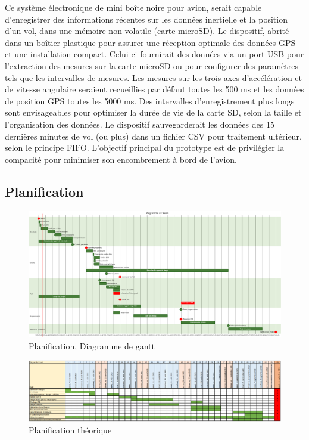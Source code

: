 Ce système électronique de mini boîte noire pour avion, serait capable d'enregistrer des informations récentes sur les données inertielle et la position d'un vol, dans une mémoire non volatile (carte microSD). Le dispositif, abrité dans un boîtier plastique pour assurer une réception optimale des données GPS et une installation compact. Celui-ci fournirait des données via un port USB pour l'extraction des mesures sur la carte microSD ou pour configurer des paramètres tels que les intervalles de mesures. Les mesures sur les trois axes d'accélération et de vitesse angulaire seraient recueillies par défaut toutes les 500 ms et les données de position GPS toutes les 5000 ms. Des intervalles d'enregistrement plus longs sont envisageables pour optimiser la durée de vie de la carte SD, selon la taille et l'organisation des données. Le dispositif sauvegarderait les données des 15 dernières minutes de vol (ou plus) dans un fichier CSV pour traitement ultérieur, selon le principe FIFO. L'objectif principal du prototype est de privilégier la compacité pour minimiser son encombrement à bord de l'avion.


\clearpage

\subsection{Planification}
\begin{figure}[h]
	\centering
	\includegraphics[width=1\linewidth]{../figures/cdc/planif}
	\caption{Planification, Diagramme de gantt}
	\label{fig:planification}
\end{figure}
\begin{figure}[h]
	\centering
	\includegraphics[width=1\linewidth]{../figures/cdc/planif_theorique}
	\caption{Planification théorique}
	\label{fig:planiftheorique}
\end{figure}



